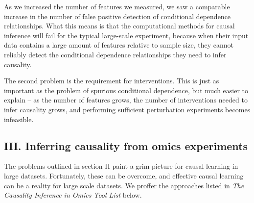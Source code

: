 \documentclass[journal=jacsat,manuscript=article]{achemso}
\begin{document}
As we increased the number of features we measured, we saw a comparable increase in 
the number of false positive detection of conditional dependence relationships. What this
means is that the computational methods for causal inference will fail for the
typical large-scale experiment, because when their input data contains a
large amount of features relative to sample size, they cannot reliably
detect the conditional dependence relationships they need to infer
causality.

The second problem is the requirement for interventions. This is just as important as the 
problem of spurious conditional dependence, but much easier to explain -- as the number
of features grows, the number of interventions needed to infer causality
grows, and performing sufficient perturbation experiments becomes
infeasible.


\subsection{III. Inferring causality from omics experiments}

The problems outlined in section II paint a grim picture for causal
learning in large datasets. Fortunately, these can be overcome, and
effective causal learning can be a reality for large scale datasets. We
proffer the approaches listed in \textit{The Causality Inference in Omics Tool List}
below.
\end{document}
